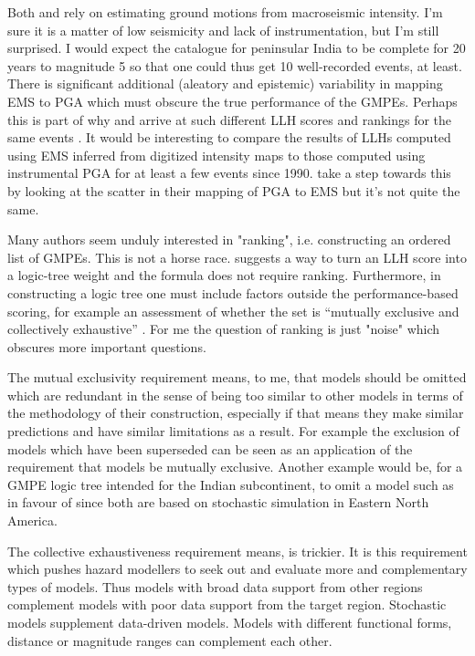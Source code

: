 \documentclass{article}
\begin{document}
Both \cite{anbazhagan2015selection} and \cite{nath2011peak} rely on estimating ground motions from macroseismic intensity. I'm sure it is a matter of low seismicity and lack of instrumentation, but I'm still surprised. I would expect the catalogue for peninsular India to be complete for 20 years to magnitude 5 so that one could thus get 10 well-recorded events, at least. There is significant additional (aleatory and epistemic) variability in mapping EMS to PGA which must obscure the true performance of the GMPEs.  Perhaps this is part of why  \cite{anbazhagan2015selection} and \cite{nath2011peak} arrive at such different LLH scores and rankings for the same events \cite[][Table 5]{anbazhagan2015selection}. It would be interesting to compare the results of LLHs computed using EMS inferred from digitized intensity maps to those computed using instrumental PGA for at least a few events since 1990. \cite{nath2011peak} take a step towards this by looking at the scatter in their mapping of PGA to EMS but it's not quite the same.

Many authors \citep{scherbaum2009model, nath2011peak, delavaud2012toward, anbazhagan2015selection} seem unduly interested in "ranking", i.e.  constructing an ordered list of GMPEs. This is not a horse race. \cite{scherbaum2009model} suggests a way to turn an LLH score into a logic-tree weight and the formula does not require ranking. Furthermore, in constructing a logic tree one must include factors outside the performance-based scoring, for example an assessment of whether the set is ``mutually exclusive and collectively exhaustive'' \citep{bommer2008use}. For me the question of ranking is just "noise" which obscures more important questions.

The mutual exclusivity requirement means, to me, that models should be omitted which are redundant in the sense of being too similar to other models in terms of the methodology of their construction, especially if that means they make similar predictions and have similar limitations as a result. For example the exclusion of models which have been superseded \citep{cotton2006criteria} can be seen as an application of the requirement that models be mutually exclusive. Another example would be, for a GMPE logic tree intended for the Indian subcontinent, to omit a model such as \cite{hwang1997attenuation} in favour of \cite{atkinson2006earthquake} since both are based on stochastic simulation in Eastern North America.

The collective exhaustiveness requirement means, is trickier. It is this requirement which pushes hazard modellers to seek out and evaluate more and complementary types of models. Thus models with broad data support from other regions complement models with poor data support from the target region. Stochastic models supplement data-driven models. Models with different functional forms, distance or magnitude ranges can complement each other.
\end{document}
